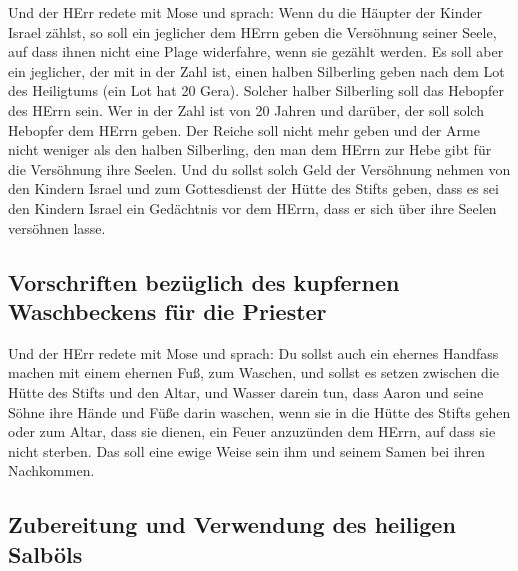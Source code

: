  Und der HErr redete mit Mose und sprach: 
Wenn du die Häupter der Kinder Israel zählst, so soll ein jeglicher dem
HErrn geben die Versöhnung seiner Seele, auf dass ihnen nicht eine Plage
widerfahre, wenn sie gezählt werden.  Es soll aber ein
jeglicher, der mit in der Zahl ist, einen halben Silberling geben nach
dem Lot des Heiligtums (ein Lot hat 20 Gera). Solcher halber Silberling
soll das Hebopfer des HErrn sein.  Wer in der Zahl ist
von 20 Jahren und darüber, der soll solch Hebopfer dem HErrn geben.
 Der Reiche soll nicht mehr geben und der Arme nicht
weniger als den halben Silberling, den man dem HErrn zur Hebe gibt für
die Versöhnung ihre Seelen.  Und du sollst solch Geld der
Versöhnung nehmen von den Kindern Israel und zum Gottesdienst der Hütte
des Stifts geben, dass es sei den Kindern Israel ein Gedächtnis vor dem
HErrn, dass er sich über ihre Seelen versöhnen lasse.

\hypertarget{vorschriften-bezuxfcglich-des-kupfernen-waschbeckens-fuxfcr-die-priester}{%
\subsection{Vorschriften bezüglich des kupfernen Waschbeckens für die
Priester}\label{vorschriften-bezuxfcglich-des-kupfernen-waschbeckens-fuxfcr-die-priester}}

 Und der HErr redete mit Mose und sprach: 
Du sollst auch ein ehernes Handfass machen mit einem ehernen Fuß, zum
Waschen, und sollst es setzen zwischen die Hütte des Stifts und den
Altar, und Wasser darein tun,  dass Aaron und seine Söhne
ihre Hände und Füße darin waschen,  wenn sie in die Hütte
des Stifts gehen oder zum Altar, dass sie dienen, ein Feuer anzuzünden
dem HErrn,  auf dass sie nicht sterben. Das soll eine
ewige Weise sein ihm und seinem Samen bei ihren Nachkommen.

\hypertarget{zubereitung-und-verwendung-des-heiligen-salbuxf6ls}{%
\subsection{Zubereitung und Verwendung des heiligen
Salböls}\label{zubereitung-und-verwendung-des-heiligen-salbuxf6ls}}

